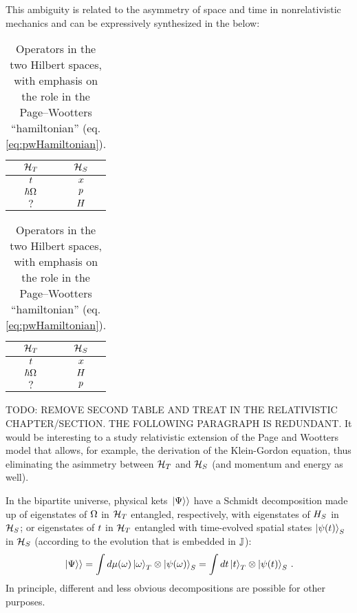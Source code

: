 This ambiguity is related to the a\-sym\-me\-try of space and time in
non\-re\-la\-ti\-vi\-stic
mechanics and can be expressively synthesized in the below:
{
  \begin{table}[h!]
    \parbox{.45\linewidth}{
      \centering
      \begin{tabular}{c|c}
        $\mathcal{H}_T$        & $\mathcal{H}_S$  \\
        \hline
        \hline
        ${t}$           & ${x}$     \\
        \hline
        $\hbar{\Omega}$ & ${p}$     \\
        \hline
        $?$                 & ${H}$
      \end{tabular}
      {\caption{
        Operators in the two Hilbert spaces,
        with emphasis on the algebraic relation
        to other operators in the same space.
      }\label{op_comparison_alg}}
    }
    \hfill
    \parbox{.45\linewidth}{
      \centering
      \begin{tabular}{c|c}
        $\mathcal{H}_T$        & $\mathcal{H}_S$  \\
        \hline
        \hline
        ${t}$           & ${x}$     \\
        \hline
        $\hbar{\Omega}$ & ${H}$     \\
        \hline
        $?$                 & ${p}$
      \end{tabular}
      {\caption{
        Operators in the two Hilbert spaces,
        with emphasis on the role in the
        Page--Wootters ``hamiltonian'' (eq. \ref{eq:pwHamiltonian}).
      }\label{op_comparison_J}}
    }
  \end{table}
}

TODO: REMOVE SECOND TABLE AND TREAT IN THE RELATIVISTIC CHAPTER/SECTION.
THE FOLLOWING PARAGRAPH IS REDUNDANT.
It would be interesting to a study relativistic extension of the
Page and Wootters model that allows, for example, the derivation of the Klein-Gordon
equation, thus eliminating the asimmetry between
$\mathcal{H}_T$ and $\mathcal{H}_S$ (and momentum and energy as well).

In the bipartite universe, physical kets $\left.\left| \Psi \right\rangle\right\rangle$ have a Schmidt decomposition
made up of
eigenstates of ${\Omega}$ in $\mathcal{H}_T$
entangled, respectively, with
eigenstates of ${H}_S$ in $\mathcal{H}_S$;
or eigenstates of ${t}$ in $\mathcal{H}_T$
entangled with time-evolved spatial states $\ket{\psi(t)}_S$ in $\mathcal{H}_S$
(according to the evolution that is embedded in ${\mathbb{J}}$):
\begin{equation}
  \left.\left| \Psi \right\rangle\right\rangle = \int d\mu(\omega) \ket{\omega}_{T}\otimes\ket{\psi(\omega)}_{S} = \int dt \ket{t}_{T} \otimes \ket{\psi(t)}_{S}\,\text{.} 
\end{equation}
In principle, different and less obvious decompositions are possible for other purposes.






